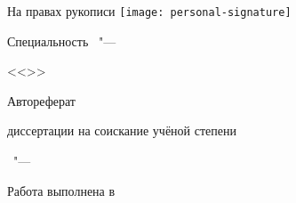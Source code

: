 \thispagestyle{empty}

\vspace{0pt plus1fill} %
\begin{flushright}
  \large{На правах рукописи}
  \texttt{[image: personal-signature]} 
\end{flushright}

\vspace{0pt plus3fill} %
\begin{center}
\textbf {\large \thesisAuthor}
\end{center}

\vspace{0pt plus3fill} %
\begin{center}
\textbf {\Large \thesisTitle}

\vspace{0pt plus3fill} %
{\large Специальность \thesisSpecialtyNumber\ "---\par <<\thesisSpecialtyTitle>>}

\vspace{0pt plus1.5fill} %
\Large{Автореферат}\par
\large{диссертации на соискание учёной степени\par \thesisDegree}
\end{center}

\vspace{0pt plus4fill} %
\begin{center}
{\large{\thesisCity\ "--- \thesisYear}}
\end{center}

\newpage
\thispagestyle{empty}
\noindent Работа выполнена в \thesisInOrganization

